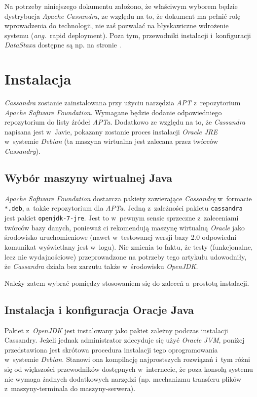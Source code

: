 \documentclass{article} %
\begin{document}
Na potrzeby niniejszego dokumentu założono, że właściwym wyborem będzie dystrybucja \emph{Apache Cassandra}, ze względu na to, że dokument ma pełnić rolę wprowadzenia do technologii, nie zaś pozwalać na błyskawiczne wdrożenie systemu (\textit{ang.}~rapid deployment).
Poza tym, przewodniki instalacji i~konfiguracji \emph{DataStaxa} dostępne są np. na stronie \cite{datastax_guides}.

\section{Instalacja}\label{sec:install}

\emph{Cassandra} zostanie zainstalowana przy użyciu narzędzia \emph{APT} z~repozytorium \emph{Apache Software Foundation}.
Wymagane będzie dodanie odpowiedniego repozytorium do listy źródeł \emph{APTa}.
Dodatkowo ze względu na to, że \emph{Cassandra} napisana jest w~Javie, pokazany zostanie proces instalacji \emph{Oracle JRE} w~systemie \emph{Debian} (ta maszyna wirtualna jest zalecana przez twórców \emph{Cassandry}).

\subsection{Wybór maszyny wirtualnej Java}\label{subsec:install_vm}

\emph{Apache Software Foundation} dostarcza pakiety zawierające \emph{Cassandrę} w~formacie \texttt{*.deb}, a~także repozytorium dla \emph{APTa}.
Jedną z~zależności pakietu \texttt{cassandra} jest pakiet \texttt{openjdk-7-jre}.
Jest to w~pewnym sensie sprzeczne z~zaleceniami twórców bazy danych, ponieważ ci rekomendują maszynę wirtualną \emph{Oracle} jako środowisko uruchomieniowe (nawet w~testowanej wersji bazy 2.0 odpowiedni komunikat wyświetlany jest w~logu).
Nie zmienia to faktu, że testy (funkcjonalne, lecz nie wydajnościowe) przeprowadzone na potrzeby tego artykułu udowodniły, że \emph{Cassandra} działa bez zarzutu także w~środowisku \emph{OpenJDK}. 

Należy zatem wybrać pomiędzy stosowaniem się do zaleceń a~prostotą instalacji.

\subsection{Instalacja i konfiguracja Oracje Java}\label{subsec:install_oracle}

Pakiet z~\emph{OpenJDK} jest instalowany jako pakiet zależny podczas instalacji Cassandry.
Jeżeli jednak administrator zdecyduje się użyć \emph{Oracle JVM}, poniżej przedstawiona jest skrótowa procedura instalacji tego oprogramowania w~systemie \emph{Debian}.
Stanowi ona kompilację najprostszych rozwiązań i~tym różni się od większości przewodników dostępnych w~internecie, że poza konsolą systemu nie wymaga żadnych dodatkowych narzędzi (np. mechanizmu transferu plików z~maszyny-terminala do maszyny-serwera).
\end{document}
